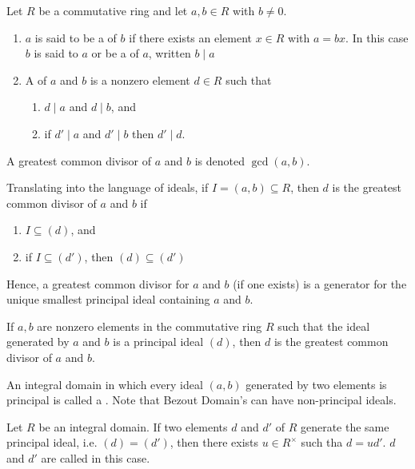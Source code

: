 \documentclass[12pt, a4paper, oneside, openright, titlepage]{book}
\begin{document}
\begin{defn}
    Let $R$ be a commutative ring and let $a,b \in R$ with $b \neq 0$. \begin{enumerate}
        \item $a$ is said to be a  of $b$ if there exists an element $x \in R$ with $a = bx$. In this case $b$ is said to  $a$ or be a  of $a$, written $b\;\vert\;a$
        \item A  of $a$ and $b$ is a nonzero element $d \in R$ such that \begin{enumerate}
                \item $d\;\vert\;a$ and $d\;\vert\;b$, and 
                \item if $d'\;\vert\;a$ and $d'\;\vert\;b$ then $d'\;\vert\;d$.
        \end{enumerate}
    \end{enumerate}
    A greatest common divisor of $a$ and $b$ is denoted $\gcd(a,b)$.
\end{defn}


\begin{rmk}
    Translating into the language of ideals, if $I = (a,b) \subseteq R$, then $d$ is the greatest common divisor of $a$ and $b$ if \begin{enumerate}
        \item $I \subseteq (d)$, and
        \item if $I \subseteq (d')$, then $(d) \subseteq (d')$
    \end{enumerate}
    Hence, a greatest common divisor for $a$ and $b$ (if one exists) is a generator for the unique smallest principal ideal containing $a$ and $b$.
\end{rmk}


\begin{prop}
    If $a,b$ are nonzero elements in the commutative ring $R$ such that the ideal generated by $a$ and $b$ is a principal ideal $(d)$, then $d$ is the greatest common divisor of $a$ and $b$.
\end{prop}

\begin{defn}
    An integral domain in which every ideal $(a,b)$ generated by two elements is principal is called a . Note that Bezout Domain's can have non-principal ideals.
\end{defn}

\begin{prop}
    Let $R$ be an integral domain. If two elements $d$ and $d'$ of $R$ generate the same principal ideal, i.e. $(d) = (d')$, then there exists $u \in R^{\times}$ such tha $d = ud'$. $d$ and $d'$ are called  in this case.
\end{prop}
\end{document}
